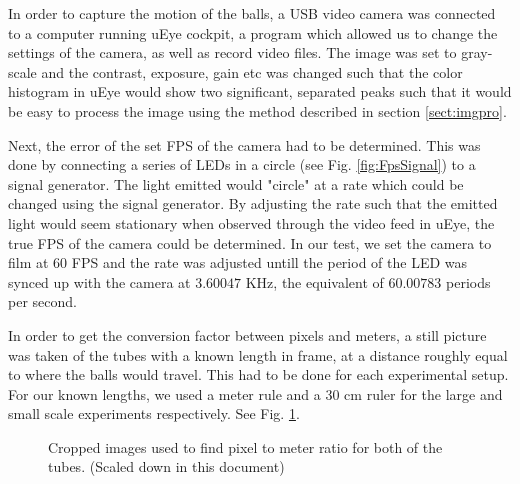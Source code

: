 \documentclass[11pt,a4paper]{article}
\begin{document}
    In order to capture the motion of the balls, a USB video camera was connected to a computer running uEye cockpit\cite{_ueye_????}, a program which allowed us to change the settings of the camera, as well as record video files. The image was set to gray-scale and the contrast, exposure, gain etc was changed such that the color histogram in uEye would show two significant, separated peaks such that it would be easy to process the image using the method described in section \ref{sect:imgpro}.

    Next, the error of the set FPS of the camera had to be determined. This was done by connecting a series of LEDs in a circle (see Fig. \ref{fig:FpsSignal}) to a signal generator. The light emitted would "circle" at a rate which could be changed using the signal generator. By adjusting the rate such that the emitted light would seem stationary when observed through the video feed in uEye, the true FPS of the camera could be determined. In our test, we set the camera to film at 60 FPS and the rate was adjusted untill the period of the LED was synced up with the camera at $3.60047$ KHz, the equivalent of $60.00783$ periods per second.

    In order to get the conversion factor between pixels and meters, a still picture was taken of the tubes with a known length in frame, at a distance roughly equal to where the balls would travel. This had to be done for each experimental setup. For our known lengths, we used a meter rule and a $30$ cm ruler for the large and small scale experiments respectively. See Fig. \ref{fig:scale1}.

    \begin{figure}[H]
      \center
      \caption{Cropped images used to find pixel to meter ratio for both of the tubes. (Scaled down in this document)}
      \label{fig:scale1}
    \end{figure}
  
\end{document}
